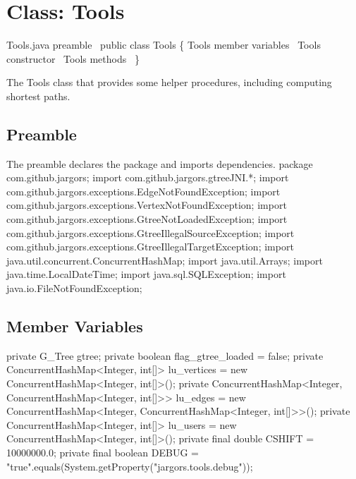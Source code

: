 \nwenddocs{}\chapter{Class: Tools}
\label{tools}

\nwenddocs{}\endmoddef{}
\LA{}Tools.java preamble~{\nwtagstyle{}}\RA{}
public class Tools \{
  \LA{}\code{}Tools\edoc{} member variables~{\nwtagstyle{}}\RA{}
  \LA{}\code{}Tools\edoc{} constructor~{\nwtagstyle{}}\RA{}
  \LA{}\code{}Tools\edoc{} methods~{\nwtagstyle{}}\RA{}
\}
\nwendcode{}\nwdocspar

The Tools class that provides some helper procedures, including computing
shortest paths.

\section{Preamble}
The preamble declares the package and imports dependencies.
\nwenddocs{}\endmoddef{}
package com.github.jargors;
import com.github.jargors.gtreeJNI.*;
import com.github.jargors.exceptions.EdgeNotFoundException;
import com.github.jargors.exceptions.VertexNotFoundException;
import com.github.jargors.exceptions.GtreeNotLoadedException;
import com.github.jargors.exceptions.GtreeIllegalSourceException;
import com.github.jargors.exceptions.GtreeIllegalTargetException;
import java.util.concurrent.ConcurrentHashMap;
import java.util.Arrays;
import java.time.LocalDateTime;
import java.sql.SQLException;
import java.io.FileNotFoundException;
\nwendcode{}\nwdocspar

\section{Member Variables}
\nwenddocs{}\endmoddef{}
private G_Tree gtree;
private boolean flag_gtree_loaded = false;
private ConcurrentHashMap<Integer, int[]> lu_vertices = new ConcurrentHashMap<Integer, int[]>();
private ConcurrentHashMap<Integer,
    ConcurrentHashMap<Integer, int[]>>    lu_edges    = new ConcurrentHashMap<Integer, ConcurrentHashMap<Integer, int[]>>();
private ConcurrentHashMap<Integer, int[]> lu_users    = new ConcurrentHashMap<Integer, int[]>();
private final double CSHIFT = 10000000.0;
private final boolean DEBUG = "true".equals(System.getProperty("jargors.tools.debug"));
\nwendcode{}\nwdocspar

